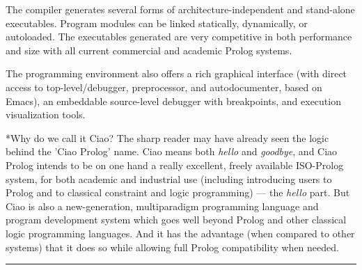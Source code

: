 \documentclass{article}
\makeatletter
\def\subsection{\@startsection{subsection}{2}{\z@}{-1.0ex plus -1ex minus 
 -.2ex}{0.7ex plus .2ex}{\normalsize\bf}}
\makeatother
\begin{document}
The compiler generates several forms of architecture-independent and
stand-alone executables. Program modules can be 
linked statically, dynamically, or autoloaded. The executables
generated are very competitive in both performance and size with all
current commercial and academic Prolog systems.  

The programming environment also offers a rich graphical interface
(with direct access to top-level/debugger, preprocessor, and
autodocumenter, based on Emacs), an embeddable source-level debugger
with breakpoints, and execution visualization tools.

\medskip

\subsection*{Why do we call it Ciao?}
The sharp reader may have already seen the logic behind the 'Ciao
Prolog' name. Ciao means both \emph{hello} and \emph{goodbye}, and
Ciao Prolog intends to be on one hand a really excellent, freely
available ISO-Prolog system, for both academic and industrial use
(including introducing users to Prolog and to classical constraint and
logic programming) --- the \emph{hello} part.  But Ciao is also a
new-generation, multiparadigm programming language and program
development system which goes well beyond Prolog and other classical
logic programming languages. And it has the advantage (when compared
to other systems) that it does so while allowing full Prolog
compatibility when needed.


\medskip\hrule
\end{document}
